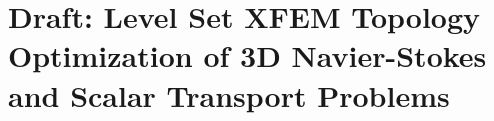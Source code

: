 \chapter{Draft: Level Set XFEM Topology Optimization of 3D Navier-Stokes and Scalar Transport Problems}
\label{sec:level_set_XFEM_topology_optimization_of_3D_navier_stokes_and_scalar_transport_problems}






% 








